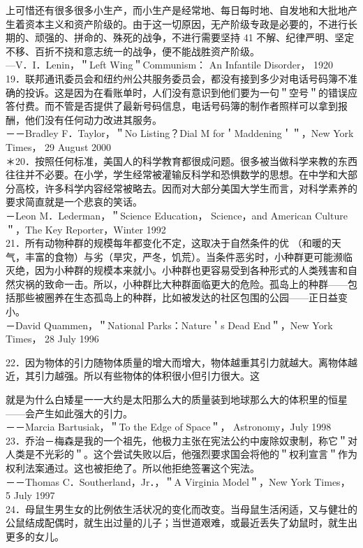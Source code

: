 上可惜还有很多很多小生产，而小生产是经常地、每日每时地、自发地和大批地产生着资本主义和资产阶级的。由于这一切原因，无产阶级专政是必要的，不进行长期的、顽强的、拼命的、殊死的战争，不进行需要坚持 41 不解、纪律严明、坚定不移、百折不挠和意志统一的战争，便不能战胜资产阶级。\\
—V．I．Lenin，＂Left Wing＂Communism： An Infantile Disorder， 1920\\
19．联邦通讯委员会和纽约州公共服务委员会，都没有接到多少对电话号码簿不准确的投诉。这是因为在看账单时，人们没有意识到他们要为一句＂空号＂的错误应答付费。而不管是否提供了最新号码信息，电话号码簿的制作者照样可以拿到报酬，他们没有任何动力改进其服务。\\
－－Bradley F．Taylor，＂No Listing？Dial M for＇Maddening＇＂，New York Times， 29 August 2000\\
＊20．按照任何标准，美国人的科学教育都很成问题。很多被当做科学来教的东西往往并不必要。在小学，学生经常被灌输反科学和恐惧数学的思想。在中学和大部分高校，许多科学内容经常被略去。因而对大部分美国大学生而言，对科学素养的要求简直就是一个悲哀的笑话。\\
－Leon M．Lederman，＂Science Education， Science，and American Culture＂，The Key Reporter，Winter 1992\\
21．所有动物种群的规模每年都变化不定，这取决于自然条件的优 （和暖的天气，丰富的食物）与劣（旱灾，严冬，饥荒）。当条件恶劣时，小种群更可能濒临灭绝，因为小种群的规模本来就小。小种群也更容易受到各种形式的人类残害和自然灾祸的致命一击。所以，小种群比大种群面临更大的危险。孤岛上的种群——包括那些被圈养在生态孤岛上的种群，比如被发达的社区包围的公园——正日益变小。\\
－David Quammen，＂National Parks：Nature＇s Dead End＂，New York Times， 28 July 1996

22．因为物体的引力随物体质量的增大而增大，物体越重其引力就越大。离物体越近，其引力越强。所以有些物体的体积很小但引力很大。这

就是为什么白矮星一一大约是太阳那么大的质量装到地球那么大的体积里的恒星——会产生如此强大的引力。\\
－－Marcia Bartusiak，＂To the Edge of Space＂， Astronomy，July 1998\\
23．乔治－梅森是我的一个祖先，他极力主张在宪法公约中废除奴隶制，称它＂对人类是不光彩的＂。这个尝试失败以后，他强烈要求国会将他的＂权利宣言＂作为权利法案通过。这也被拒绝了。所以他拒绝签署这个宪法。\\
－－Thomas C．Southerland，Jr．，＂A Virginia Model＂，New York Times， 5 July 1997\\
24．母鼠生男生女的比例依生活状况的变化而改变。当母鼠生活闲适，又与健壮的公鼠结成配偶时，就生出过量的儿子；当世道艰难，或最近丢失了幼鼠时，就生出更多的女儿。

